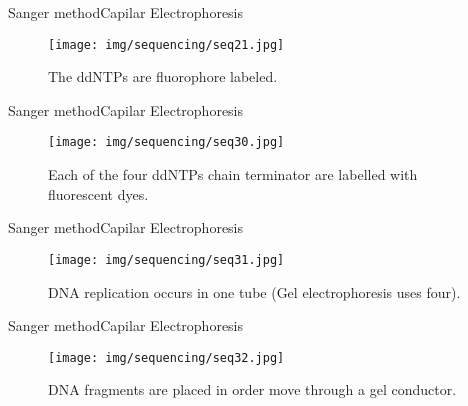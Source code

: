 \documentclass[10pt]{beamer}
\newcommand{\1}{
	\setbeamertemplate{background}{
		\texttt{[image: img/1]}
		\tikz[overlay] \fill[fill opacity=0.75,fill=white] (0,0) rectangle (-\paperwidth,\paperheight);
	}
}
\begin{document}
\begin{frame}{Sanger method}{Capilar Electrophoresis}
	\begin{figure}[]
		\centering
		\texttt{[image: img/sequencing/seq21.jpg]}
		\label{img:mot2}
		\caption{The ddNTPs are fluorophore labeled.}
	\end{figure}
\end{frame}

\begin{frame}{Sanger method}{Capilar Electrophoresis}
	\begin{figure}[]
		\centering
		\texttt{[image: img/sequencing/seq30.jpg]}
		\label{img:mot2}
		\caption{Each of the four ddNTPs chain terminator are labelled with fluorescent dyes.}
	\end{figure}
\end{frame}

\begin{frame}{Sanger method}{Capilar Electrophoresis}
	\begin{figure}[]
		\centering
		\texttt{[image: img/sequencing/seq31.jpg]}
		\label{img:mot2}
		\caption{DNA replication occurs in one tube (Gel electrophoresis uses four).}
	\end{figure}
\end{frame}



\begin{frame}{Sanger method}{Capilar Electrophoresis}
	\begin{figure}[]
		\centering
		\texttt{[image: img/sequencing/seq32.jpg]}
		\label{img:mot2}
		\caption{DNA fragments are placed in order move through a gel conductor.}
	\end{figure}
\end{frame}
\end{document}
